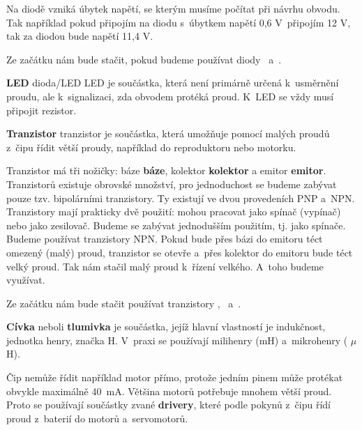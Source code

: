 Na diodě vzniká úbytek napětí, se kterým musíme počítat při návrhu obvodu. Tak například pokud připojím na diodu s~úbytkem napětí 0,6 V~připojím 12 V, tak za diodou bude napětí 11,4 V. 

Ze začátku nám bude stačit, pokud budeme používat diody   
\Black \
a~\Black .

 


{\bf LED}
\ii{LED} \ii dioda/LED \ii LED  je součástka, která není primárně určená k~usměrnění proudu, ale k~signalizaci, zda obvodem protéká proud. K~LED se vždy musí připojit rezistor. 


{\bf Tranzistor} \ii tranzistor  je součástka, která umožňuje pomocí malých proudů z~čipu řídit větší proudy, například do reproduktoru nebo motorku. 

Tranzistor má tři nožičky: \ii báze {\bf báze}, \ii kolektor {\bf kolektor} a \ii emitor {\bf emitor}. Tranzistorů existuje obrovské množství, pro jednoduchost se budeme zabývat pouze tzv. bipolárními tranzistory. Ty existují ve dvou provedeních PNP a~NPN. Tranzistory mají prakticky dvě použití: mohou pracovat jako spínač (vypínač) nebo jako zesilovač. Budeme se zabývat jednodušším použitím, tj. jako spínače. Budeme používat tranzistory NPN. Pokud bude přes bázi do emitoru téct omezený (malý) proud, tranzistor se otevře a~přes kolektor do emitoru bude téct velký proud. Tak nám stačil malý proud k~řízení velkého. A~toho budeme využívat. 

Ze začátku nám bude stačit používat tranzistory 
\Black , 
\Black \
a~\Black .



{\bf Cívka}  neboli {\bf tlumivka}  je součástka, jejíž hlavní vlastností je indukčnost, jednotka henry, značka H. V~praxi se používají milihenry (mH) a~mikrohenry ( $\mu$H).

\secc{Driver}

Čip nemůže řídit například motor přímo, protože jedním pinem může protékat obvykle maximálně 40~mA. Většina motorů potřebuje mnohem větší proud. Proto se používají součástky zvané  {\bf drivery}, které podle pokynů z~čipu řídí proud z~baterií do motorů a~servomotorů.  

